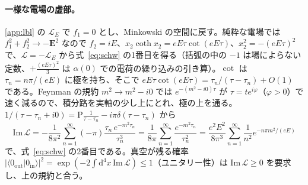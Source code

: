 \documentclass[a4paper,10pt]{ltjsarticle}
\newcommand{\dd}{\mathrm{d}}
\begin{document}
\paragraph{一様な電場の虚部。}\ref{app:lbl} の $\mathcal L_E$ で $f_1=0$ とし、Minkowski の空間に戻す。純粋な電場では $f_1^2+f_2^2\to-\boldsymbol E^2$ なので $f_2=iE$、$x_2\coth x_2=eE\tau\cot(eE\tau)$、$x_2^2=-(eE\tau)^2$ で、$\mathcal L=-\mathcal L_E$ から式~\eqref{eq:schw} の1番目を得る（括弧の中の $-1$ は場によらない定数、$+\frac{(eE\tau)^2}{3}$ は $\alpha(0)$ での電荷の繰り込みの引き算）。$\cot$ は $\tau_n=n\pi/(eE)$ に極を持ち、そこで $eE\tau\cot(eE\tau)=\tau_n/(\tau-\tau_n)+O(1)$ である。Feynman の規約 $m^2\to m^2-i0$ では $e^{-(m^2-i0)\tau}$ が $\tau=te^{i\varphi}$（$\varphi>0$）で速く減るので、積分路を実軸の少し上にとれ、極の上を通る。$1/(\tau-\tau_n+i0)=\mathrm P\frac{1}{\tau-\tau_n}-i\pi\delta(\tau-\tau_n)$ から
\begin{equation*}
\mathrm{Im}\,\mathcal L=-\frac{1}{8\pi^2}\sum_{n=1}^\infty(-\pi)\frac{\tau_n\,e^{-m^2\tau_n}}{\tau_n^3}=\frac{1}{8\pi}\sum_{n=1}^\infty\frac{e^{-m^2\tau_n}}{\tau_n^2}=\frac{e^2E^2}{8\pi^3}\sum_{n=1}^\infty\frac{1}{n^2}e^{-n\pi m^2/(eE)}
\end{equation*}
で、式~\eqref{eq:schw} の2番目である。真空が残る確率 $|\langle0_{\mathrm{out}}|0_{\mathrm{in}}\rangle|^2=\exp(-2\int\dd^4x\,\mathrm{Im}\,\mathcal L)\le1$（ユニタリー性）は $\mathrm{Im}\,\mathcal L\ge0$ を要求し、上の規約と合う。
\end{document}
